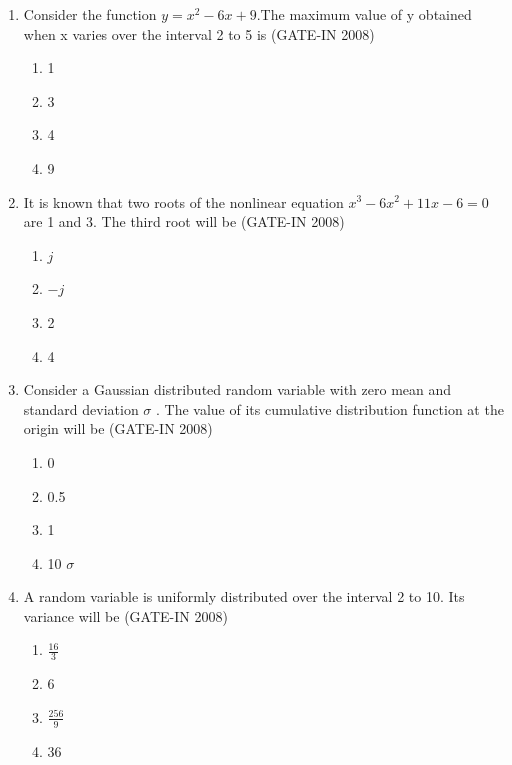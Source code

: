 \documentclass[journal,12pt,onecolumn]{IEEEtran}
\theoremstyle{remark}
\begin{document}
\begin{enumerate}
    \item  Consider the function $y=x^2 -6x +9$.The maximum value of y obtained when x varies over the interval 2 to 5 is \hfill{(GATE-IN 2008)}
    \begin{multicols}{4}
    \begin{enumerate} 
        \item 1
        \item 3 
        \item 4 
        \item 9
    \end{enumerate}
    \end{multicols}
    
    \item It is known that two roots of the nonlinear equation $x^3 -6x^2 +11x -6 = 0$ are 1 and 3. The third root will be \hfill{(GATE-IN 2008)}
    \begin{multicols}{4}
    \begin{enumerate} 
        \item $j$ 
        \item $-j$
        \item 2
        \item 4
    \end{enumerate}
    \end{multicols}
    
    \item Consider a Gaussian distributed random variable with zero mean and standard deviation $\sigma$ . The
value of its cumulative distribution function at the origin will be \hfill{(GATE-IN 2008)}
\begin{multicols}{4}
    \begin{enumerate} 
        \item 0
        \item 0.5
        \item 1
        \item 10 $\sigma$
    \end{enumerate}
    \end{multicols}
    
    \item  A random variable is uniformly distributed over the interval 2 to 10. Its variance will be \hfill{(GATE-IN 2008)}
    \begin{multicols}{4}
    \begin{enumerate} 
        \item \(\frac{16}{3}\) 
        \item 6
        \item \(\frac{256}{9}\)
        \item 36
    \end{enumerate}
    \end{multicols}
    

\end{enumerate}
\end{document}
